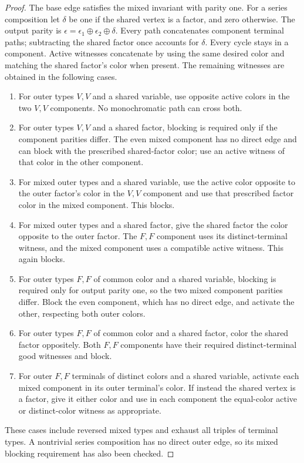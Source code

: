 \begin{proof}
The base edge satisfies the mixed invariant with parity one. For a
series composition let $\delta$ be one if the shared vertex is a factor,
and zero otherwise. The output parity is
$\epsilon=\epsilon_1\mathbin\oplus\epsilon_2\mathbin\oplus\delta$.
Every path concatenates component terminal paths; subtracting the
shared factor once accounts for $\delta$. Every cycle stays in a
component. Active witnesses concatenate by using the same desired color
and matching the shared factor's color when present. The remaining
witnesses are obtained in the following cases.
\begin{enumerate}
\item For outer types $V,V$ and a shared variable, use opposite active
colors in the two $V,V$ components. No monochromatic path can cross both.
\item For outer types $V,V$ and a shared factor, blocking is required
only if the component parities differ. The even mixed component has no
direct edge and can block with the prescribed shared-factor color;
use an active witness of that color in the other component.
\item For mixed outer types and a shared variable, use the active color
opposite to the outer factor's color in the $V,V$ component and use
that prescribed factor color in the mixed component. This blocks.
\item For mixed outer types and a shared factor, give the shared factor
the color opposite to the outer factor. The $F,F$ component uses its
distinct-terminal witness, and the mixed component uses a compatible
active witness. This again blocks.
\item For outer types $F,F$ of common color and a shared variable,
blocking is required only for output parity one, so the two mixed
component parities differ. Block the even component, which has no
direct edge, and activate the other, respecting both outer colors.
\item For outer types $F,F$ of common color and a shared factor, color
the shared factor oppositely. Both $F,F$ components have their required
distinct-terminal good witnesses and block.
\item For outer $F,F$ terminals of distinct colors and a shared
variable, activate each mixed component in its outer terminal's color.
If instead the shared vertex is a factor, give it either color and use
in each component the equal-color active or distinct-color witness
as appropriate.
\end{enumerate}
These cases include reversed mixed types and exhaust all triples of
terminal types. A nontrivial series composition has no direct outer edge,
so its mixed blocking requirement has also been checked.


\end{proof}
